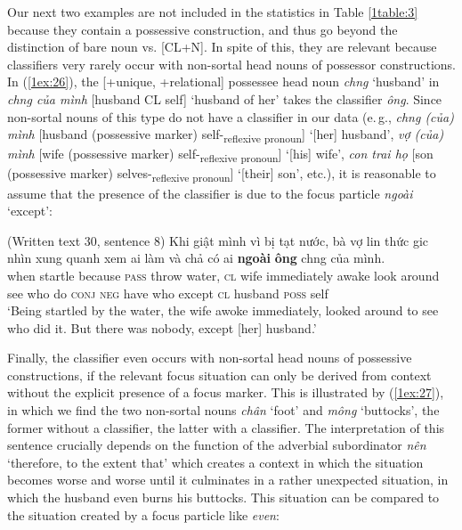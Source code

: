 \documentclass[output=paper]{langsci/langscibook}
\begin{document}
{
Our next two examples are not included in the statistics in Table \ref{1table:3} because they contain a possessive construction, and thus go beyond the distinction of bare noun vs. [CL+N]. In spite of this, they are relevant because classifiers very rarely occur with non-sortal head nouns of possessor constructions. In (\ref{1ex:26}), the [+unique, +relational] possessee head noun {\emph{ch{\daob}ng}} `husband' in {\emph{ch{\daob}ng của mình}} [husband CL self] `husband of her' takes the classifier {\emph{ông}}. Since non-sortal nouns of this type do not have a classifier in our data (e.\,g., {\emph{ch{\daob}ng (của) mình}} [husband (possessive marker) self-\textsubscript{reflexive pronoun}] `[her] husband', {\emph{vợ (của) mình}} [wife (possessive marker) self-\textsubscript{reflexive pronoun}] `[his] wife', {\emph{con trai họ}} [son (possessive marker) selves-\textsubscript{reflexive pronoun}] `[their] son', etc.), it is reasonable to assume that the presence of the classifier is due to the focus particle {\emph{ngoài}} `except':
}

\begin{exe}
\ex\label{1ex:26}
(Written text 30, sentence 8)
\exi{}
\gll Khi    {giật mình}  vì            bị        tạt      nước,  bà  vợ    li{\daeb}n                {thức gi{\daa}c}  nhìn {xung quanh} xem  ai     làm  và        chả  có      ai    {\textbf{ngoài}}   {\textbf{ông}} ch{\daob}ng     của     mình. \\
when startle        because {\textsc{pass}}  throw water, {\textsc{cl}} wife immediately  awake       look  around         see   who do    {\textsc{conj}} {\textsc{neg}} have who except  {\textsc{cl}}  husband {\textsc{poss}}  self \\
\glt `Being startled by the water, the wife awoke immediately, looked around to see who did it. But there was nobody, except [her] husband.'
\end{exe}

Finally, the classifier even occurs with non-sortal head nouns of possessive constructions, if the relevant focus situation can only be derived from context without the explicit presence of a focus marker. This is illustrated by (\ref{1ex:27}), in which we find the two non-sortal nouns {\emph{chân}} `foot' and {\emph{mông}} `buttocks', the former without a classifier, the latter with a classifier. The interpretation of this sentence crucially depends on the function of the adverbial subordinator {\emph{nên}} `therefore, to the extent that' which creates a context in which the situation becomes worse and worse until it culminates in a rather unexpected situation, in which the husband even burns his buttocks. This situation can be compared to the situation created by a focus particle like {\emph{even}}:
\end{document}
